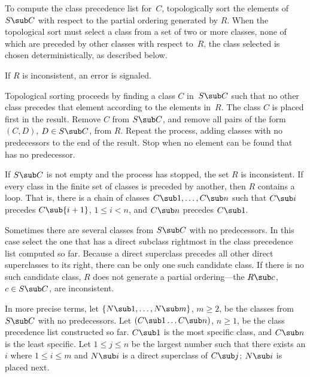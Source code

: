 To compute the class precedence list for~$C$\negthinspace,
topologically sort the elements of $S\sub C$ with respect to the
partial ordering generated by $R$\negthinspace.  When the topological
sort must select a class from a set of two or more classes, none of
which are preceded by other classes with respect to~$R$\negthinspace,
the class selected is chosen deterministically, as described below.

If $R$ is inconsistent, an error is signaled.


\goodbreak


Topological sorting proceeds by finding a class $C$ in~$S\sub C$ such
that no other class precedes that element according to the elements
in~$R$\negthinspace.  The class $C$ is placed first in the result.
Remove $C$ from $S\sub C$, and remove all pairs of the form $(C,D)$,
$D\in S\sub C$, from $R$\negthinspace. Repeat the process, adding
classes with no predecessors to the end of the result.  Stop when no
element can be found that has no predecessor.

If $S\sub C$ is not empty and the process has stopped, the set $R$ is
inconsistent. If every class in the finite set of classes is preceded
by another, then $R$ contains a loop. That is, there is a chain of
classes $C\sub 1,\ldots,C\sub n$ such that $C\sub i$ precedes
$C\sub{i+1}$, $1\leq i<n$, and $C\sub n$ precedes $C\sub 1$.

Sometimes there are several classes from $S\sub C$ with no
predecessors.  In this case select the one that has a direct
subclass rightmost in the class precedence list computed so far.
Because a direct superclass precedes all other direct superclasses to
its right, there can be only one such candidate class. If there is no
such candidate class, $R$ does not generate a partial ordering---the
$R\sub c$, $c\in S\sub C$, are inconsistent.

In more precise terms, let $\{N\sub 1,\ldots,N\sub m\}$, $m\geq 2$, be
the classes from $S\sub C$ with no predecessors.  Let $(C\sub
1\ldots C\sub n)$, $n\geq 1$, be the class precedence list
constructed so far.  $C\sub 1$ is the most specific class, and $C\sub
n$ is the least specific.  Let $1\leq j\leq n$ be the largest number
such that there exists an $i$ where $1\leq i\leq m$ and $N\sub i$
is a direct superclass of $C\sub j$; $N\sub i$ is placed next.

